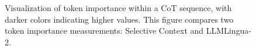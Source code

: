 \begin{figure}[t]
    \centering
    \caption{Visualization of token importance within a CoT sequence, with darker colors indicating higher values. This figure compares two token importance measurements: Selective Context and LLMLingua-2.}
    \label{fig:token-importance}
\end{figure}